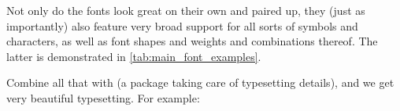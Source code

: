 Not only do the fonts look great on their own and paired up, they (just as importantly)
also feature very broad support for all sorts of symbols and characters, as well as font
shapes and weights and combinations thereof.
The latter is demonstrated in \cref{tab:main_font_examples}.
%
\begin{table}\ContinuedFloat*
\end{table}

Combine all that with  (a package taking care of typesetting
details), and we get very beautiful typesetting.
For example:

\begin{displayquote}
    \blindtext
\end{displayquote}

